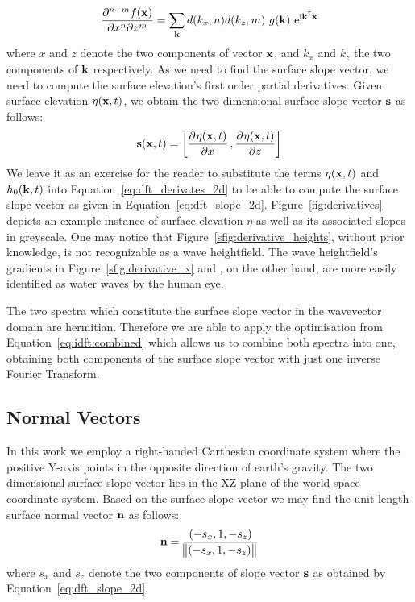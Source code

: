 \begin{equation}
\label{eq:dft_derivates_2d}
 \dmd{f(\mvec{x})}{n+m}{x}{n}{z}{m} = \sum_{\mvec{k}}d(k_{x}, n)d(k_{z}, m)~g(\mvec{k})~\mathrm{e}^{\mathrm{i}\transpose{\mvec{k}}\mvec{x}}
\end{equation}
where $x$ and $z$ denote the two components of vector $\mathbf{x}$, and $k_x$ and $k_z$ 
the two components of \wavevector $\mathbf{k}$ respectively.
As we need to find the surface slope vector, we need to compute 
the surface elevation's first order partial derivatives. Given surface 
elevation $\eta(\mathbf{x},t)$, we obtain the two dimensional surface slope 
vector $\mathbf{s}$ as follows:
\begin{equation}
\label{eq:dft_slope_2d}
 \mvec{s}(\mvec{x},t) = \left[\dpd{\eta(\mvec{x},t)}{x}, \dpd{\eta(\mvec{x},t)}{z}\right]
\end{equation}
We leave it as an exercise for the reader to substitute the terms $\eta(\mathbf{x},t)$
and $h_0(\mathbf{k},t)$ into Equation~\ref{eq:dft_derivates_2d} to be able to
compute the surface slope vector as given in Equation~\ref{eq:dft_slope_2d}.
Figure~\ref{fig:derivatives} depicts an example instance of surface 
elevation $\eta$ as well as its associated slopes in greyscale. One may notice
that Figure~\ref{sfig:derivative_heights}, without prior knowledge, is not 
recognizable as a wave heightfield. The wave heightfield's gradients in
Figure~\ref{sfig:derivative_x} and , on the 
other hand, are more easily identified as water waves by the human eye.

The two spectra which constitute the surface slope vector in the wavevector domain
are hermitian. Therefore we are able to apply the optimisation from
Equation~\ref{eq:idft:combined} which allows us to combine both spectra into one,
obtaining both components of the surface slope vector with just one inverse Fourier Transform.
%
\subsection{Normal Vectors}
%
In this work we employ a right-handed Carthesian coordinate system where the positive
Y-axis points in the opposite direction of earth's gravity.
The two dimensional surface slope vector lies in the XZ-plane of the world space
coordinate system. Based on the surface slope vector we may find the unit
length surface normal vector $\mathbf{n}$ as follows:
\begin{equation*}
 \mathbf{n} = \frac{(-s_x, 1, -s_z)}{\norm{(-s_x, 1, -s_z)}}
\end{equation*}
where $s_x$ and $s_z$ denote the two components of slope vector $\mathbf{s}$
as obtained by Equation~\ref{eq:dft_slope_2d}.
%
